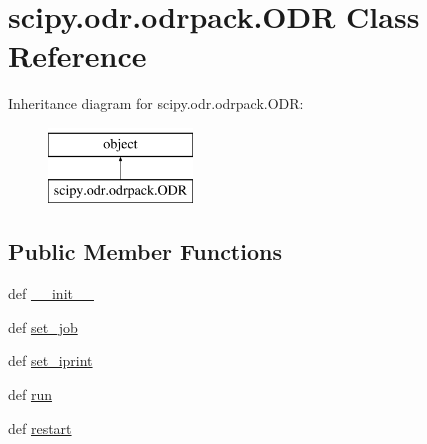 \hypertarget{classscipy_1_1odr_1_1odrpack_1_1ODR}{}\section{scipy.\+odr.\+odrpack.\+O\+D\+R Class Reference}
\label{classscipy_1_1odr_1_1odrpack_1_1ODR}
Inheritance diagram for scipy.\+odr.\+odrpack.\+O\+D\+R\+:\begin{figure}[H]
\begin{center}
\leavevmode
\includegraphics[height=2.000000cm]{classscipy_1_1odr_1_1odrpack_1_1ODR}
\end{center}
\end{figure}
\subsection*{Public Member Functions}
\begin{DoxyCompactItemize}
\item 
def \hyperlink{classscipy_1_1odr_1_1odrpack_1_1ODR_ad9484218993c8d711c396a335896a83f}{\+\_\+\+\_\+init\+\_\+\+\_\+}
\item 
def \hyperlink{classscipy_1_1odr_1_1odrpack_1_1ODR_ab359bd7832159643545d6e68e974532b}{set\+\_\+job}
\item 
def \hyperlink{classscipy_1_1odr_1_1odrpack_1_1ODR_a65b34b80660dd204f34fb2022b2b87bd}{set\+\_\+iprint}
\item 
def \hyperlink{classscipy_1_1odr_1_1odrpack_1_1ODR_a06fc7d3173d87f24367fc7a456c0d973}{run}
\item 
def \hyperlink{classscipy_1_1odr_1_1odrpack_1_1ODR_a2b3c7ae6ab90e7bce54a91c68f411c66}{restart}
\end{DoxyCompactItemize}
